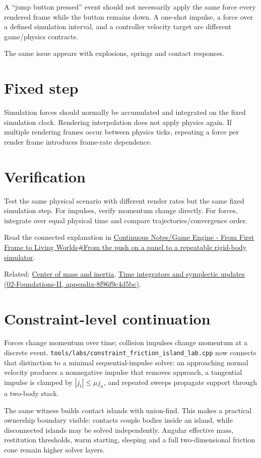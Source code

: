 A ``jump button pressed'' event should not necessarily apply the same force every rendered frame while the button remains down. A one-shot impulse, a force over a defined simulation interval, and a controller velocity target are different game/physics contracts.

The same issue appears with explosions, springs and contact responses.

\section{Fixed step}\label{appendix-c39931e6e4c2-fixed-step}

Simulation forces should normally be accumulated and integrated on the fixed simulation clock. Rendering interpolation does not apply physics again. If multiple rendering frames occur between physics ticks, repeating a force per render frame introduces frame-rate dependence.

\section{Verification}\label{appendix-c39931e6e4c2-verification}

Test the same physical scenario with different render rates but the same fixed simulation step. For impulses, verify momentum change directly. For forces, integrate over equal physical time and compare trajectories/convergence order.

Read the connected explanation in \href{Continuous\%20Notes/Game\%20Engine\%20-\%20From\%20First\%20Frame\%20to\%20Living\%20Worlds\#From\%20the\%20push\%20on\%20a\%20panel\%20to\%20a\%20repeatable\%20rigid-body\%20simulator}{Continuous Notes/Game Engine - From First Frame to Living Worlds\#From the push on a panel to a repeatable rigid-body simulator}.

Related: \hyperref[appendix-66742099f8a0]{Center of mass and inertia}, \href{../02-Foundations-II/main.pdf\#nameddest=appendix-8f96f9c4d5bc}{Time integrators and symplectic updates (02-Foundations-II, appendix-8f96f9c4d5bc)}.

\section{Constraint-level continuation}\label{appendix-c39931e6e4c2-constraint-level-continuation}

Forces change momentum over time; collision impulses change momentum at a discrete event. \texttt{tools/labs/constraint\_friction\_island\_lab.cpp} now connects that distinction to a minimal sequential-impulse solver: an approaching normal velocity produces a nonnegative impulse that removes approach, a tangential impulse is clamped by \(|j_t|\le\mu j_n\), and repeated sweeps propagate support through a two-body stack.

The same witness builds contact islands with union-find. This makes a practical ownership boundary visible: contacts couple bodies inside an island, while disconnected islands may be solved independently. Angular effective mass, restitution thresholds, warm starting, sleeping and a full two-dimensional friction cone remain higher solver layers.
